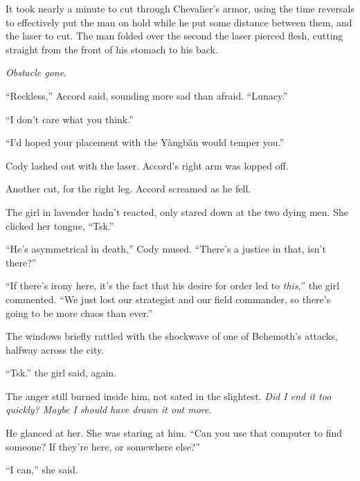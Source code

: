 It took nearly a minute to cut through Chevalier's armor, using the time reversals to effectively put the man on hold while he put some distance between them, and the laser to cut.  The man folded over the second the laser pierced flesh, cutting straight from the front of his stomach to his back.



\emph{Obstacle gone}.



``Reckless,'' Accord said, sounding more sad than afraid.  ``Lunacy.''



``I don't care what you think.''



``I'd hoped your placement with the Y\`{a}ngb\v{a}n would temper you.''



Cody lashed out with the laser.  Accord's right arm was lopped off.



Another cut, for the right leg.  Accord screamed as he fell.



The girl in lavender hadn't reacted, only stared down at the two dying men.  She clicked her tongue, ``Tsk.''



``He's asymmetrical in death,'' Cody mused.  ``There's a justice in that, isn't there?''



``If there's irony here, it's the fact that his desire for order led to \emph{this},'' the girl commented.  ``We just lost our strategist and our field commander, so there's going to be more chaos than ever.''



The windows briefly rattled with the shockwave of one of Behemoth's attacks, halfway across the city.



``Tsk.''  the girl said, again.



The anger still burned inside him, not sated in the slightest.  \emph{Did I end it too quickly?  Maybe I should have drawn it out more}.



He glanced at her.  She was staring at him.  ``Can you use that computer to find someone?  If they're here, or somewhere else?''



``I can,'' she said.



